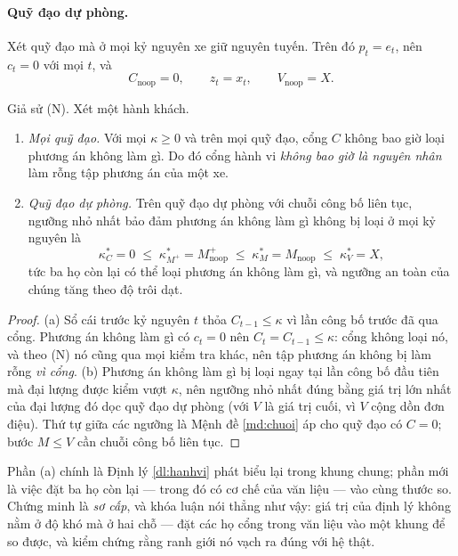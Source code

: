 \paragraph{Quỹ đạo dự phòng.} Xét quỹ đạo mà ở mọi kỷ nguyên xe giữ nguyên tuyến. Trên đó
$p_t = e_t$, nên $c_t = 0$ với mọi $t$, và
\[
C_{\text{noop}} = 0, \qquad z_t = x_t, \qquad V_{\text{noop}} = X .
\]

\begin{dinhly}
\label{dl:hocong}
Giả sử (N). Xét một hành khách.
\begin{enumerate}[label=(\alph*),leftmargin=1cm,itemsep=2pt,topsep=3pt]
\item \emph{Mọi quỹ đạo.} Với mọi $\kappa \ge 0$ và trên mọi quỹ đạo, cổng $C$ không bao giờ loại
phương án không làm gì. Do đó cổng hành vi \emph{không bao giờ là nguyên nhân} làm rỗng tập phương
án của một xe.
\item \emph{Quỹ đạo dự phòng.} Trên quỹ đạo dự phòng với chuỗi công bố liên tục, ngưỡng nhỏ nhất
bảo đảm phương án không làm gì không bị loại ở mọi kỷ nguyên là
\[
\kappa^{*}_{C} = 0 \;\le\; \kappa^{*}_{M^{+}} = M^{+}_{\text{noop}} \;\le\;
\kappa^{*}_{M} = M_{\text{noop}} \;\le\; \kappa^{*}_{V} = X ,
\]
tức ba họ còn lại có thể loại phương án không làm gì, và ngưỡng an toàn của chúng tăng theo độ
trôi dạt.
\end{enumerate}
\end{dinhly}

\begin{proof}
(a) Sổ cái trước kỷ nguyên $t$ thỏa $C_{t-1} \le \kappa$ vì lần công bố trước đã qua cổng. Phương
án không làm gì có $c_t = 0$ nên $C_t = C_{t-1} \le \kappa$: cổng không loại nó, và theo (N) nó
cũng qua mọi kiểm tra khác, nên tập phương án không bị làm rỗng \emph{vì cổng}. (b) Phương án không
làm gì bị loại ngay tại lần công bố đầu tiên mà đại lượng được kiểm vượt $\kappa$, nên ngưỡng nhỏ
nhất đúng bằng giá trị lớn nhất của đại lượng đó dọc quỹ đạo dự phòng (với $V$ là giá trị cuối, vì
$V$ cộng dồn đơn điệu). Thứ tự giữa các ngưỡng là Mệnh đề \ref{md:chuoi} áp cho quỹ đạo có
$C = 0$; bước $M \le V$ cần chuỗi công bố liên tục.
\end{proof}

Phần (a) chính là Định lý \ref{dl:hanhvi} phát biểu lại trong khung chung; phần mới là việc đặt ba họ còn lại
--- trong đó có cơ chế của văn liệu --- vào cùng thước so. Chứng minh là \emph{sơ cấp}, và khóa
luận nói thẳng như vậy: giá trị của định lý không nằm ở độ khó mà ở hai chỗ --- đặt các họ cổng
trong văn liệu vào một khung để so được, và kiểm chứng rằng ranh giới nó vạch ra đúng với hệ thật.

